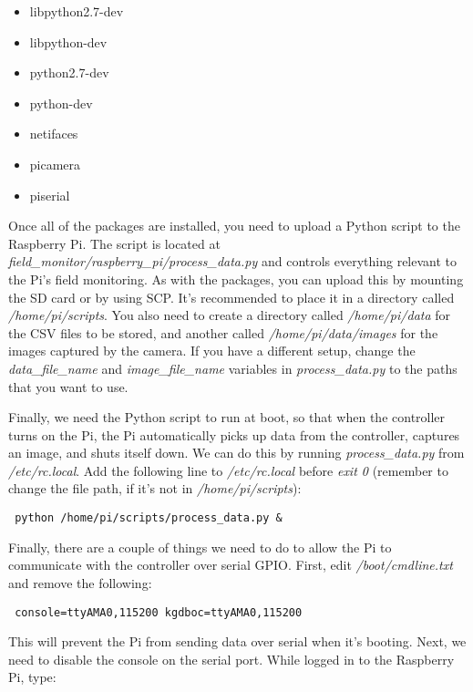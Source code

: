 \documentclass[10pt]{article}
\begin{document}
\begin{itemize}
 \item libpython2.7-dev
 \item libpython-dev 
 \item python2.7-dev 
 \item python-dev 
 \item netifaces
 \item picamera
 \item piserial
\end{itemize}

Once all of the packages are installed, you need to upload a Python script to the Raspberry Pi. The script is located at
\textit{field\_monitor/raspberry\_pi/process\_data.py} and controls everything relevant to the Pi's field monitoring. As with the packages, you can upload this by
mounting the SD card or by using SCP. It's recommended to place it in a directory called \textit{/home/pi/scripts}. You also need to create a directory called
\textit{/home/pi/data} for the CSV files to be stored, and another called \textit{/home/pi/data/images} for the images captured by the camera. If you have a different
setup, change the \textit{data\_file\_name} and \textit{image\_file\_name} variables in \textit{process\_data.py} to the paths that you want to use.

Finally, we need the Python script to run at boot, so that when the controller turns on the Pi, the Pi automatically picks up data from the controller, captures an
image, and shuts itself down. We can do this by running \textit{process\_data.py} from \textit{/etc/rc.local}. Add the following line to \textit{/etc/rc.local} before
\textit{exit 0} (remember to change the file path, if it's not in \textit{/home/pi/scripts}):

\begin{verbatim}
 python /home/pi/scripts/process_data.py &
\end{verbatim}

Finally, there are a couple of things we need to do to allow the Pi to communicate with the controller over serial GPIO. First, edit \textit{/boot/cmdline.txt} and remove
the following:

\begin{verbatim}
 console=ttyAMA0,115200 kgdboc=ttyAMA0,115200
\end{verbatim}

This will prevent the Pi from sending data over serial when it's booting. Next, we need to disable the console on the serial port. While logged in to the Raspberry Pi,
type:
\end{document}
